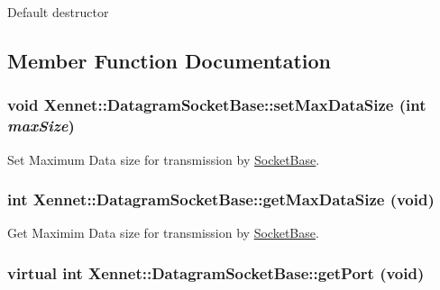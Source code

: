 Default destructor 

\subsection{Member Function Documentation}
\hypertarget{classXennet_1_1DatagramSocketBase_874f711e80bbfb068cada65f595cf67e}{
\subsubsection{\setlength{\rightskip}{0pt plus 5cm}void Xennet::DatagramSocketBase::setMaxDataSize (int {\em maxSize})}}
\label{classXennet_1_1DatagramSocketBase_874f711e80bbfb068cada65f595cf67e}


Set Maximum Data size for transmission by \hyperlink{classXennet_1_1SocketBase}{SocketBase}. 

\hypertarget{classXennet_1_1DatagramSocketBase_7034b0625b0b7f62cb93804594bad713}{
\subsubsection{\setlength{\rightskip}{0pt plus 5cm}int Xennet::DatagramSocketBase::getMaxDataSize (void)}}
\label{classXennet_1_1DatagramSocketBase_7034b0625b0b7f62cb93804594bad713}


Get Maximim Data size for transmission by \hyperlink{classXennet_1_1SocketBase}{SocketBase}. 

\hypertarget{classXennet_1_1DatagramSocketBase_36fd9c4e4edc3d71df606ac8335150d1}{
\subsubsection{\setlength{\rightskip}{0pt plus 5cm}virtual int Xennet::DatagramSocketBase::getPort (void)}}
\label{classXennet_1_1DatagramSocketBase_36fd9c4e4edc3d71df606ac8335150d1}


